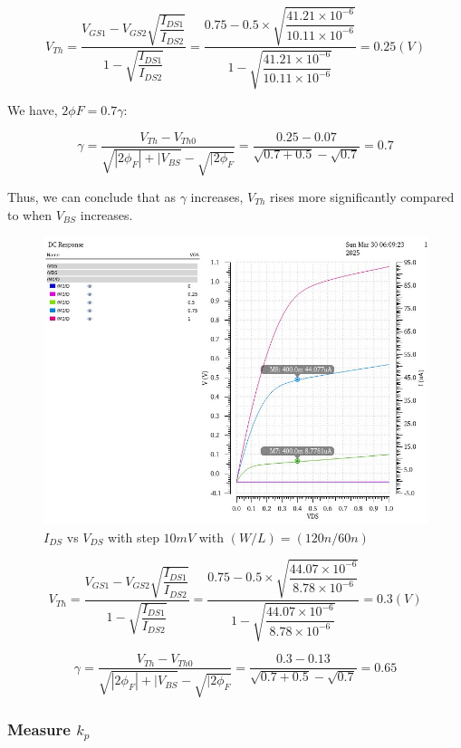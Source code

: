 \[ V_{Th} = \dfrac{V_{GS1} - V_{GS2}\sqrt{\dfrac{I_{DS1}}{I_{DS2}}}}{1 - \sqrt{\dfrac{I_{DS1}}{I_{DS2}}}} = \dfrac{0.75 - 0.5\times \sqrt{\dfrac{41.21\times 10^{-6}}{10.11\times 10^{-6}}}}{1 - \sqrt{\dfrac{41.21\times 10^{-6}}{10.11\times 10^{-6}}}} = 0.25(V)\] 


We have, $2\phi F = 0.7 \gamma$:

\[ \gamma = \dfrac{V_{Th} - V_{Th0}}{\sqrt{|2\phi_{F}| + |V_{BS} } - \sqrt{|2\phi_{F}}} = \dfrac{0.25 - 0.07}{\sqrt{0.7 + 0.5} - \sqrt{0.7}} =0.7 \]

Thus, we can conclude that as $\gamma$ increases, $V_{Th}$ rises more significantly compared to when $V_{BS}$ increases.\\


\begin{figure}[H]
	\centering
	\includegraphics[width=.6\linewidth]{sections/pic/EX3_NMOS_gamma_(w_l)(120_60).png}
	\caption{$I_{DS}$ vs $V_{DS}$ with step $10mV$ with $(W/L) = (120n/60n)$}
	\label{f_EX3_NMOS_gamma_(w_l)(120_60)}
\end{figure}

\[ V_{Th} = \dfrac{V_{GS1} - V_{GS2}\sqrt{\dfrac{I_{DS1}}{I_{DS2}}}}{1 - \sqrt{\dfrac{I_{DS1}}{I_{DS2}}}} = \dfrac{0.75 - 0.5\times \sqrt{\dfrac{44.07\times 10^{-6}}{8.78\times 10^{-6}}}}{1 - \sqrt{\dfrac{44.07\times 10^{-6}}{8.78\times 10^{-6}}}} = 0.3(V)\] 

\[ \gamma = \dfrac{V_{Th} - V_{Th0}}{\sqrt{|2\phi_{F}| + |V_{BS} } - \sqrt{|2\phi_{F}}} = \dfrac{0.3 - 0.13}{\sqrt{0.7 + 0.5} - \sqrt{0.7}} = 0.65 \]

\subsubsection{Measure $k_p$}


